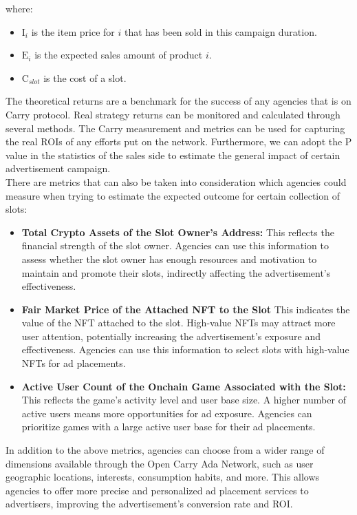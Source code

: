where:
\begin{itemize}
    \item \( \text{I}_i \) is the item price for \(i\) that has been sold in this campaign duration. 
    \item \( \text{E}_i \) is the expected sales amount of product \(i\).
    \item \( \text{C}_{slot} \) is the cost of a slot.
\end{itemize}


The theoretical returns are a benchmark for the success of any agencies that is on Carry protocol. Real strategy returns can be monitored and calculated through several methods. The Carry measurement and metrics can be used for capturing the real ROIs of any efforts put on the network. Furthermore, we can adopt the P value in the statistics of the sales side to estimate the general impact of certain advertisement campaign.\\

There are metrics that can also be taken into consideration which agencies could measure when trying to estimate the expected outcome for certain collection of slots:

\begin{itemize}
    \item \textbf{Total Crypto Assets of the Slot Owner's Address:} This reflects the financial strength of the slot owner. Agencies can use this information to assess whether the slot owner has enough resources and motivation to maintain and promote their slots, indirectly affecting the advertisement’s effectiveness.
    \item \textbf{Fair Market Price of the Attached NFT to the Slot} This indicates the value of the NFT attached to the slot. High-value NFTs may attract more user attention, potentially increasing the advertisement’s exposure and effectiveness. Agencies can use this information to select slots with high-value NFTs for ad placements.
    \item \textbf{Active User Count of the Onchain Game Associated with the Slot:} This reflects the game’s activity level and user base size. A higher number of active users means more opportunities for ad exposure. Agencies can prioritize games with a large active user base for their ad placements.
\end{itemize}

In addition to the above metrics, agencies can choose from a wider range of dimensions available through the Open Carry Ada Network, such as user geographic locations, interests, consumption habits, and more. This allows agencies to offer more precise and personalized ad placement services to advertisers, improving the advertisement’s conversion rate and ROI.


